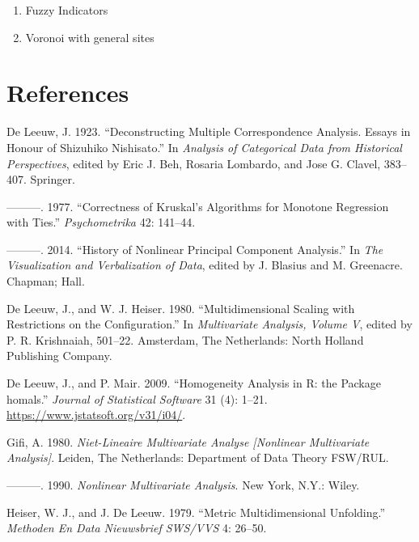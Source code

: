 \documentclass[
  12pt,
]{article}
\providecommand{\tightlist}{%
  \setlength{\itemsep}{0pt}\setlength{\parskip}{0pt}}
\newlength{\cslhangindent}
\newenvironment{CSLReferences}[2] %
 {\begin{list}{}{%
  \setlength{\itemindent}{0pt}
  \setlength{\leftmargin}{0pt}
  \setlength{\parsep}{0pt}
  \ifodd #1
   \setlength{\leftmargin}{\cslhangindent}
   \setlength{\itemindent}{-1\cslhangindent}
  \fi
  \setlength{\itemsep}{#2\baselineskip}}}
 {\end{list}}
\begin{document}
\begin{enumerate}
\def\labelenumi{\arabic{enumi}.}
\tightlist
\item
  Fuzzy Indicators
\item
  Voronoi with general sites
\end{enumerate}

\section*{References}\label{references}

\label{refs}
\begin{CSLReferences}{1}{0}
De Leeuw, J. 1923. {``Deconstructing Multiple Correspondence Analysis. Essays in Honour of Shizuhiko Nishisato.''} In \emph{Analysis of Categorical Data from Historical Perspectives}, edited by Eric J. Beh, Rosaria Lombardo, and Jose G. Clavel, 383--407. Springer.

---------. 1977. {``Correctness of Kruskal's Algorithms for Monotone Regression with Ties.''} \emph{Psychometrika} 42: 141--44.

---------. 2014. {``{History of Nonlinear Principal Component Analysis}.''} In \emph{{The Visualization and Verbalization of Data}}, edited by J. Blasius and M. Greenacre. Chapman; Hall.

De Leeuw, J., and W. J. Heiser. 1980. {``Multidimensional Scaling with Restrictions on the Configuration.''} In \emph{Multivariate Analysis, Volume {V}}, edited by P. R. Krishnaiah, 501--22. Amsterdam, The Netherlands: North Holland Publishing Company.

De Leeuw, J., and P. Mair. 2009. {``{Homogeneity Analysis in {R}: the Package homals}.''} \emph{Journal of Statistical Software} 31 (4): 1--21. \url{https://www.jstatsoft.org/v31/i04/}.

Gifi, A. 1980. \emph{Niet-Lineaire Multivariate Analyse {[}Nonlinear Multivariate Analysis{]}}. Leiden, The Netherlands: Department of Data Theory FSW/RUL.

---------. 1990. \emph{Nonlinear Multivariate Analysis}. New York, N.Y.: Wiley.

Heiser, W. J., and J. De Leeuw. 1979. {``Metric Multidimensional Unfolding.''} \emph{Methoden En Data Nieuwsbrief SWS/VVS} 4: 26--50.


\end{CSLReferences}
\end{document}
